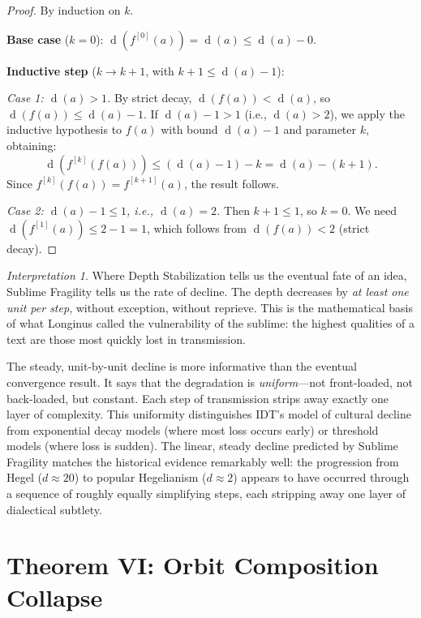 \documentclass[11pt,openany]{book}
\theoremstyle{definition}
\theoremstyle{plain}
\theoremstyle{remark}
\newtheorem{interpretation}[axiom]{Interpretation}
\newcommand{\depth}{\operatorname{d}}       %
\begin{document}
\begin{proof}
By induction on $k$.

\textbf{Base case} ($k = 0$): $\depth(f^{[0]}(a)) = \depth(a) \leq \depth(a) - 0$.

\textbf{Inductive step} ($k \to k + 1$, with $k + 1 \leq \depth(a) - 1$):

\emph{Case 1: $\depth(a) > 1$.} By strict decay, $\depth(f(a)) < \depth(a)$, so $\depth(f(a)) \leq \depth(a) - 1$. If $\depth(a) - 1 > 1$ (i.e., $\depth(a) > 2$), we apply the inductive hypothesis to $f(a)$ with bound $\depth(a) - 1$ and parameter $k$, obtaining:
\[
\depth(f^{[k]}(f(a))) \leq (\depth(a) - 1) - k = \depth(a) - (k+1).
\]
Since $f^{[k]}(f(a)) = f^{[k+1]}(a)$, the result follows.

\emph{Case 2: $\depth(a) - 1 \leq 1$, i.e., $\depth(a) = 2$.} Then $k + 1 \leq 1$, so $k = 0$. We need $\depth(f^{[1]}(a)) \leq 2 - 1 = 1$, which follows from $\depth(f(a)) < 2$ (strict decay).
\end{proof}

\begin{interpretation}
Where Depth Stabilization tells us the eventual fate of an idea, Sublime Fragility tells us the rate of decline. The depth decreases by \emph{at least one unit per step}, without exception, without reprieve. This is the mathematical basis of what Longinus called the vulnerability of the sublime: the highest qualities of a text are those most quickly lost in transmission.

The steady, unit-by-unit decline is more informative than the eventual convergence result. It says that the degradation is \emph{uniform}---not front-loaded, not back-loaded, but constant. Each step of transmission strips away exactly one layer of complexity. This uniformity distinguishes IDT's model of cultural decline from exponential decay models (where most loss occurs early) or threshold models (where loss is sudden). The linear, steady decline predicted by Sublime Fragility matches the historical evidence remarkably well: the progression from Hegel ($d \approx 20$) to popular Hegelianism ($d \approx 2$) appears to have occurred through a sequence of roughly equally simplifying steps, each stripping away one layer of dialectical subtlety.
\end{interpretation}

\section{Theorem VI: Orbit Composition Collapse}
\end{document}
